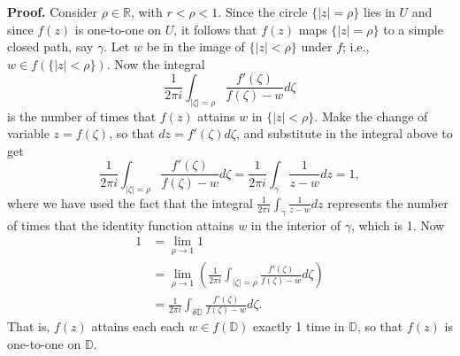 \documentclass[9pt]{article}
\newcommand{\R}{\mathbb{R}}
\begin{document}
\begin{enumerate}
      \textbf{Proof.} Consider $\rho \in \R$, with $r < \rho < 1$. Since the
      circle $\{|z| = \rho\}$ lies in $U$ and since $f(z)$ is one-to-one on $U$,
      it follows that $f(z)$ maps $\{|z| = \rho\}$ to a simple closed path, say
      $\gamma$. Let $w$ be in the image of $\{|z| < \rho\}$ under $f$; i.e.,
      $w \in f(\{|z| < \rho\})$. Now the integral
      $$\frac{1}{2\pi i}\int_{|\zeta| = \rho}
        \frac{f'(\zeta)}{f(\zeta) - w}d\zeta$$
      is the number of times that $f(z)$ attains $w$ in $\{|z| < \rho\}$. Make
      the change of variable $z = f(\zeta)$, so that $dz = f'(\zeta)d\zeta$, and
      substitute in the integral above to get
      $$\frac{1}{2\pi i}\int_{|\zeta| = \rho}
        \frac{f'(\zeta)}{f(\zeta) - w}d\zeta = \frac{1}{2\pi i}\int_\gamma
        \frac{1}{z - w}dz = 1,$$
      where we have used the fact that the integral
      $\frac{1}{2\pi i}\int_\gamma\frac{1}{z - w}dz$ represents the number of
      times that the identity function attains $w$ in the interior of $\gamma$,
      which is 1. Now
      \begin{align*}
         1 &= \lim_{\rho \rightarrow 1}1 \\
         &= \lim_{\rho \rightarrow 1}\left(\frac{1}{2\pi i}\int_{|\zeta| = \rho}
        \frac{f'(\zeta)}{f(\zeta) - w}d\zeta\right) \\
         &= \frac{1}{2\pi i}\int_{\delta \mathbb{D}}
        \frac{f'(\zeta)}{f(\zeta) - w}d\zeta.
      \end{align*}
      That is, $f(z)$ attains each each $w \in f(\mathbb{D})$ exactly 1 time in
      $\mathbb{D}$, so that $f(z)$ is one-to-one on $\mathbb{D}$.
\end{enumerate}
\end{document}
